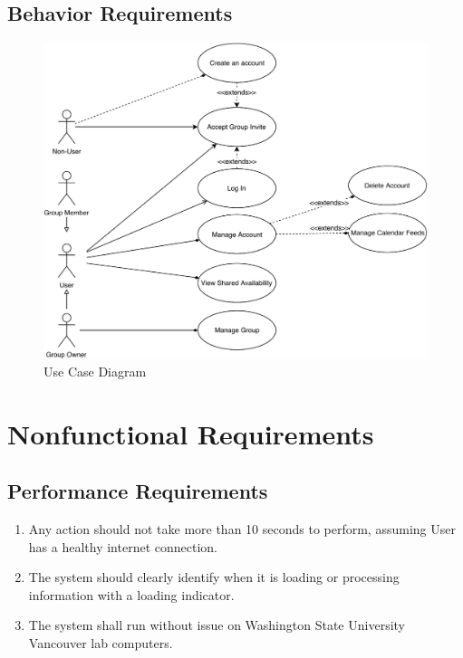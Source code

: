 \documentclass{scrreprt}
\begin{document}
\section{Behavior Requirements}

\begin{figure}[ht]
    \centering
    \includegraphics[width=1\textwidth]{CalendarProjectUseCases}
    \caption{Use Case Diagram}
    \label{fig:use-case}
\end{figure}

\chapter{Nonfunctional Requirements}

\section{Performance Requirements}
\begin{enumerate}
\item Any action should not take more than 10 seconds to perform, assuming User
has a healthy internet connection.
\item The system should clearly identify when it is loading or processing
information with a loading indicator.
\item The system shall run without issue on Washington State University Vancouver
lab computers.
\end{enumerate}
\end{document}
